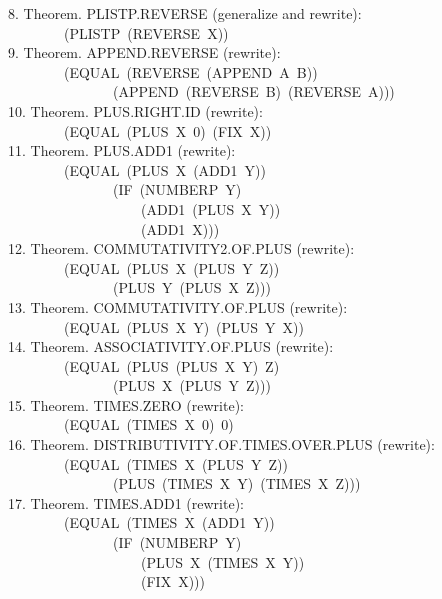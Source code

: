 \documentclass[10pt]{book}
\newenvironment{pubasis}{\begin{flushleft}}{\end{flushleft}}
\begin{document}
\begin{pubasis}
8.      Theorem.  PLISTP.REVERSE (generalize and rewrite):\\
~~~~~~~~(PLISTP~(REVERSE~X))\\

9.      Theorem.  APPEND.REVERSE (rewrite):\\
~~~~~~~~(EQUAL~(REVERSE~(APPEND~A~B))\\
~~~~~~~~~~~~~~~(APPEND~(REVERSE~B)~(REVERSE~A)))\\

10.     Theorem.  PLUS.RIGHT.ID (rewrite):\\
~~~~~~~~(EQUAL~(PLUS~X~0)~(FIX~X))\\

11.     Theorem.  PLUS.ADD1 (rewrite):\\
~~~~~~~~(EQUAL~(PLUS~X~(ADD1~Y))\\
~~~~~~~~~~~~~~~(IF~(NUMBERP~Y)\\
~~~~~~~~~~~~~~~~~~~(ADD1~(PLUS~X~Y))\\
~~~~~~~~~~~~~~~~~~~(ADD1~X)))\\

12.     Theorem.  COMMUTATIVITY2.OF.PLUS (rewrite):\\
~~~~~~~~(EQUAL~(PLUS~X~(PLUS~Y~Z))\\
~~~~~~~~~~~~~~~(PLUS~Y~(PLUS~X~Z)))\\

13.     Theorem.  COMMUTATIVITY.OF.PLUS (rewrite):\\
~~~~~~~~(EQUAL~(PLUS~X~Y)~(PLUS~Y~X))\\

14.     Theorem.  ASSOCIATIVITY.OF.PLUS (rewrite):\\
~~~~~~~~(EQUAL~(PLUS~(PLUS~X~Y)~Z)\\
~~~~~~~~~~~~~~~(PLUS~X~(PLUS~Y~Z)))\\

15.     Theorem.  TIMES.ZERO (rewrite):\\
~~~~~~~~(EQUAL~(TIMES~X~0)~0)\\

16.     Theorem.  DISTRIBUTIVITY.OF.TIMES.OVER.PLUS (rewrite):\\
~~~~~~~~(EQUAL~(TIMES~X~(PLUS~Y~Z))\\
~~~~~~~~~~~~~~~(PLUS~(TIMES~X~Y)~(TIMES~X~Z)))\\

17.     Theorem.  TIMES.ADD1 (rewrite):\\
~~~~~~~~(EQUAL~(TIMES~X~(ADD1~Y))\\
~~~~~~~~~~~~~~~(IF~(NUMBERP~Y)\\
~~~~~~~~~~~~~~~~~~~(PLUS~X~(TIMES~X~Y))\\
~~~~~~~~~~~~~~~~~~~(FIX~X)))\\


\end{pubasis}
\end{document}
